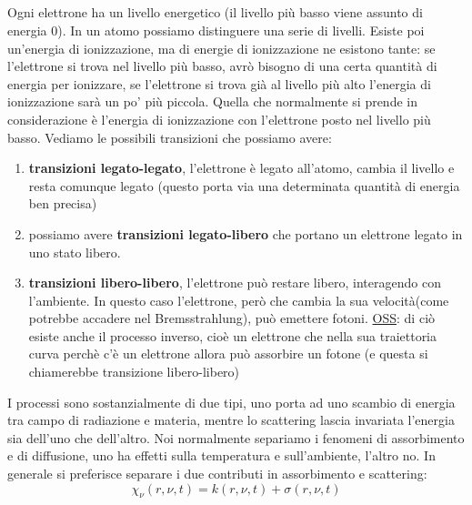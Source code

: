 \documentclass[a4paper,11pt]{article}
\begin{document}
\subsection{}
Ogni elettrone ha un livello energetico (il livello più basso viene assunto di energia $0$). In un atomo possiamo distinguere una serie di livelli. Esiste poi un'energia di ionizzazione, ma di energie di ionizzazione ne esistono tante: se l'elettrone si trova nel livello più basso, avrò bisogno di una certa quantità di energia per ionizzare, se l'elettrone si trova già al livello più alto l'energia di ionizzazione sarà un po' più piccola. Quella che normalmente si prende in considerazione è l'energia di ionizzazione con l'elettrone posto nel livello più basso.
\newline
Vediamo le possibili transizioni che possiamo avere:
\begin{enumerate}
    \item \textbf{transizioni legato-legato}, l'elettrone è legato all'atomo, cambia il livello e resta comunque legato (questo porta via una determinata quantità di energia ben precisa)
    \item possiamo avere \textbf{transizioni legato-libero} che portano un elettrone legato in uno stato libero.
    \item \textbf{transizioni libero-libero}, l'elettrone può restare libero, interagendo con l'ambiente. In questo caso l'elettrone, però che cambia la sua velocità(come potrebbe  accadere nel Bremsstrahlung), può emettere fotoni.
    \newline
    \underline{OSS}: di ciò esiste anche il processo inverso, cioè un elettrone che nella sua traiettoria curva perchè c'è un elettrone allora può assorbire un fotone (e questa si chiamerebbe transizione libero-libero)
\end{enumerate}
I processi sono sostanzialmente di due tipi, uno porta ad uno scambio di energia tra campo di radiazione e materia, mentre lo scattering lascia invariata l'energia sia dell'uno che dell'altro. Noi normalmente separiamo i fenomeni di assorbimento e di diffusione, uno ha effetti sulla temperatura e sull'ambiente, l'altro no. In generale si preferisce separare i due contributi in assorbimento e scattering:
$$
\chi_\nu(r,\nu,t)= k(r,\nu,t)+\sigma(r,\nu,t)
$$
\end{document}
